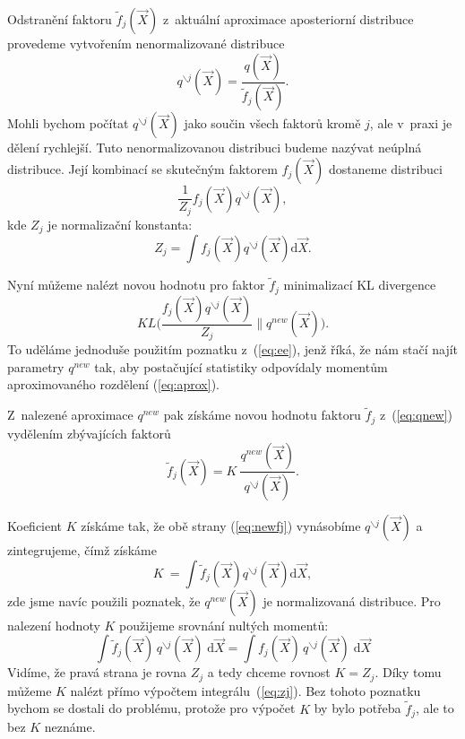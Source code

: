 Odstranění faktoru $\tilde{f}_j(\vec{X})$ z~aktuální aproximace aposteriorní distribuce provedeme vytvořením nenormalizované distribuce
\begin{equation}
q^{\backslash j}(\vec{X}) = \frac{q(\vec{X})}{\tilde{f}_j(\vec{X})}.
\end{equation}
Mohli bychom počítat $q^{\backslash j}(\vec{X})$ jako součin všech faktorů kromě $j$, ale v~praxi je dělení rychlejší.
Tuto nenormalizovanou distribuci budeme nazývat neúplná distribuce.
Její kombinací se skutečným faktorem $f_j(\vec{X})$ dostaneme distribuci
\begin{equation}
    \frac{1}{Z_j} f_j(\vec{X}) q^{\backslash j}(\vec{X}),
\label{eq:aprox}
\end{equation}
kde $Z_j$ je normalizační konstanta:
\begin{equation}
    Z_j = \int f_j(\vec{X}) q^{\backslash j}(\vec{X}) \mathrm{d}\vec{X}.
\label{eq:zj}
\end{equation}

Nyní můžeme nalézt novou hodnotu pro faktor $\tilde{f}_j$ minimalizací KL divergence
\begin{equation}
    KL\bigg(\frac{f_j(\vec{X}) q^{\backslash j}(\vec{X})}{Z_j} \bigg\| q^{new}(\vec{X})\bigg).
\end{equation}
To uděláme jednoduše použitím poznatku z~(\ref{eq:ee}), jenž říká, že nám stačí najít parametry $q^{new}$ tak, aby postačující statistiky odpovídaly momentům aproximovaného rozdělení (\ref{eq:aprox}).

Z~nalezené aproximace $q^{new}$ pak získáme novou hodnotu faktoru $\tilde{f}_j$ z~(\ref{eq:qnew}) vydělením zbývajících faktorů
\begin{equation}
    \tilde{f}_j(\vec{X}) = K~\frac{q^{new}(\vec{X})}{q^{\backslash j}(\vec{X})}.
\label{eq:newfj}
\end{equation}

Koeficient $K$ získáme tak, že obě strany (\ref{eq:newfj}) vynásobíme $q^{\backslash j}(\vec{X})$ a zintegrujeme, čímž získáme
\begin{equation}
    K~= \int \tilde{f}_j(\vec{X}) q^{\backslash j}(\vec{X}) \mathrm{d}\vec{X},
\end{equation}
zde jsme navíc použili poznatek, že $q^{new}(\vec{X})$ je normalizovaná distribuce.
Pro nalezení hodnoty $K$ použijeme srovnání nultých momentů:
\begin{equation}
    \int \tilde{f}_j (\vec{X}) \, q^{\backslash j}(\vec{X}) \; \mathrm{d}\vec{X} = \int f_j(\vec{X}) \,q^{\backslash j}(\vec{X}) \; \mathrm{d}\vec{X}
\end{equation}
Vidíme, že pravá strana je rovna $Z_j$ a tedy chceme rovnost $K = Z_j$.
Díky tomu můžeme $K$ nalézt přímo výpočtem integrálu~(\ref{eq:zj}).
Bez tohoto poznatku bychom se dostali do problému, protože pro výpočet $K$ by bylo potřeba $\tilde{f}_j$, ale to bez $K$ neznáme.

